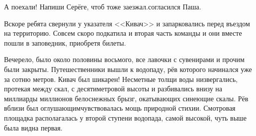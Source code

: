 \diagdash А поехали! Напиши Серёге, чтоб тоже заезжал.\mdash согласился Паша.

Вскоре ребята свернули у указателя <<Кивач>> и запарковались перед въездом на территорию. Совсем скоро подкатила и вторая часть команды и они вместе пошли в заповедник, приобретя билеты.

Вечерело, было около половины восьмого, все лавочки с сувенирами и прочим были закрыты. Путешественники вышли к водопаду, рёв которого начинался уже за сотню метров. Кивач был шикарен! Несметные толщи воды низвергались, протекая между скал, с десятиметровой высоты и разбивались внизу на миллиарды миллионов белоснежных брызг, окатывающих синеющие скалы. Рёв вблизи был оглушающим\mdash чувствовалась мощь природной стихии. Смотровая площадка располагалась у второй ступени водопада, самой высокой, чуть выше была видна первая. 






